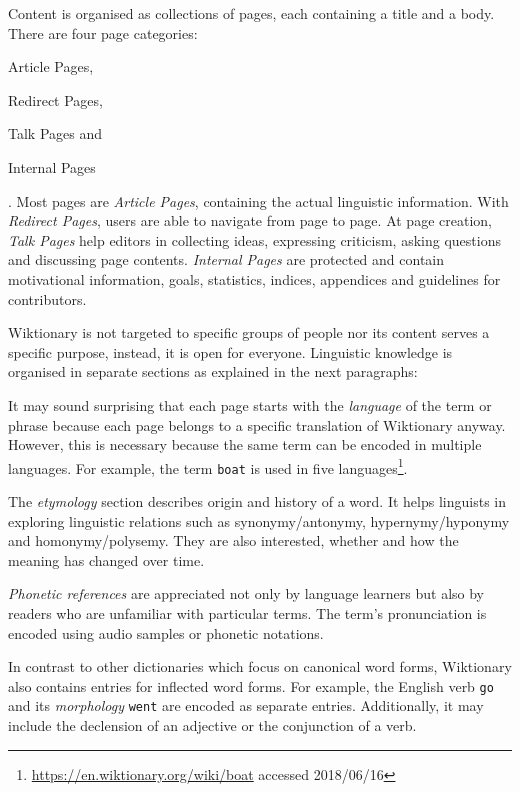 \documentclass[draft,final]{vutinfth} %
\begin{document}
Content is organised as collections of pages, each containing a title and a body. There are four page categories:
\begin{inparaenum}[1)]
		\item Article Pages,
		\item Redirect Pages,
		\item Talk Pages and
		\item Internal Pages
\end{inparaenum}.
Most pages are \emph{Article Pages}, containing the actual linguistic information. With \emph{Redirect Pages}, users are able to navigate from page to page. At page creation, \emph{Talk Pages} help editors in collecting ideas, expressing criticism, asking questions and discussing page contents. \emph{Internal Pages} are protected and contain motivational information, goals, statistics, indices, appendices and guidelines for contributors. 

Wiktionary is not targeted to specific groups of people nor its content serves a specific purpose, instead, it is open for everyone. 
Linguistic knowledge is organised in separate sections as explained in the next paragraphs: 

It may sound surprising that each page starts with the \emph{language} of the term or phrase because each page belongs to a specific translation of Wiktionary anyway. However, this is necessary because the same term can be encoded in multiple languages. For example, the term \texttt{boat} is used in five languages\footnote{\url{https://en.wiktionary.org/wiki/boat} accessed 2018/06/16}. 

The \textit{etymology} section describes origin and history of a word. It helps linguists in exploring linguistic relations such as synonymy/antonymy, hypernymy/hyponymy and homonymy/polysemy. They are also interested, whether and how the meaning has changed over time. 

\textit{Phonetic references} are appreciated not only by language learners but also by readers who are unfamiliar with particular terms. The term's pronunciation is encoded using audio samples or phonetic notations. 

In contrast to other dictionaries which focus on canonical word forms, Wiktionary also contains entries for inflected word forms. For example, the English verb \texttt{go} and its \textit{morphology} \texttt{went} are encoded as separate entries. Additionally, it may include the declension of an adjective or the conjunction of a verb.
\end{document}

